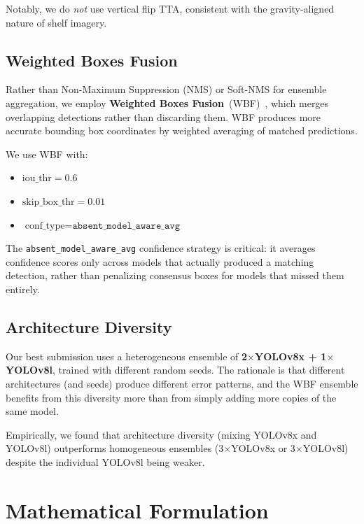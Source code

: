 \documentclass[11pt,a4paper]{article}
\begin{document}
Notably, we do \emph{not} use vertical flip TTA, consistent with the gravity-aligned nature of shelf imagery.

\subsection{Weighted Boxes Fusion}
\label{sec:wbf}

Rather than Non-Maximum Suppression (NMS) or Soft-NMS for ensemble aggregation, we employ \textbf{Weighted Boxes Fusion}~(WBF)~\citep{solovyev2021wbf}, which merges overlapping detections rather than discarding them.
WBF produces more accurate bounding box coordinates by weighted averaging of matched predictions.

We use WBF with:
\begin{itemize}    \item $\text{iou\_thr} = 0.6$
    \item $\text{skip\_box\_thr} = 0.01$
    \item $\text{conf\_type} = \texttt{absent\_model\_aware\_avg}$
\end{itemize}

The \texttt{absent\_model\_aware\_avg} confidence strategy is critical: it averages confidence scores only across models that actually produced a matching detection, rather than penalizing consensus boxes for models that missed them entirely.

\subsection{Architecture Diversity}
\label{sec:diversity}

Our best submission uses a heterogeneous ensemble of \textbf{2$\times$YOLOv8x + 1$\times$YOLOv8l}, trained with different random seeds.
The rationale is that different architectures (and seeds) produce different error patterns, and the WBF ensemble benefits from this diversity more than from simply adding more copies of the same model.

Empirically, we found that architecture diversity (mixing YOLOv8x and YOLOv8l) outperforms homogeneous ensembles (3$\times$YOLOv8x or 3$\times$YOLOv8l) despite the individual YOLOv8l being weaker.

\section{Mathematical Formulation}
\label{sec:math}
\end{document}
